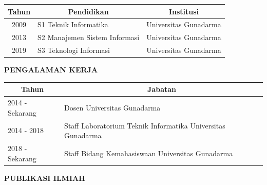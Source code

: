 \begin{table}[H]
		\centering
	\label{tab:my-table}
	\begin{longtable}{|c|l|p{5cm}|}
		\hline
		\textbf{Tahun} & \multicolumn{1}{c|}{\textbf{Pendidikan}} & \multicolumn{1}{c|}{\textbf{Institusi}} \\ \hline
		2009 & S1 Teknik Informatika & Universitas Gunadarma         \\ \hline
		2013 & S2 Manajemen  Sistem Informasi & Universitas Gunadarma  \\ \hline
		2019 & S3 Teknologi Informasi & Universitas Gunadarma \\ \hline
	\end{longtable}%
		\centering	
\end{table}

\vspace{0.5cm}
\noindent \textbf{PENGALAMAN KERJA}
\vspace{0.2cm}


\begin{table}[H]
		\centering
	\begin{tabular}{|l|p{11.5cm}|}
		\hline
		\multicolumn{1}{|c|}{\textbf{Tahun}} & \multicolumn{1}{c|}{\textbf{Jabatan}}                      \\ \hline
		2014 - Sekarang & Dosen Universitas Gunadarma  \\ \hline
		2014 - 2018 &  Staff Laboratorium Teknik Informatika Universitas Gunadarma \\ \hline
		2018 - Sekarang     &  Staff Bidang Kemahasiswaan Universitas Gunadarma \\ \hline
	\end{tabular}%
		\centering
\end{table}


\vspace{0.5cm}
\noindent \textbf{PUBLIKASI ILMIAH}
\vspace{0.2cm}


